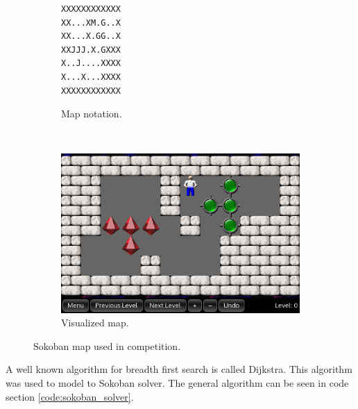 \begin{figure}[h]
 \centering
 \begin{subfigure}[b]{0.16\textwidth}
   \begin{minipage}{\linewidth}
\begin{verbatim}
XXXXXXXXXXXX
XX...XM.G..X
XX...X.GG..X
XXJJJ.X.GXXX
X..J....XXXX
X...X...XXXX
XXXXXXXXXXXX
\end{verbatim}
 \end{minipage}
 \caption{Map notation.}
 \label{fig:map_notation}
 \end{subfigure}~~~
 \begin{subfigure}[b]{0.3\textwidth}
  \includegraphics[width=\linewidth]{img/sokoban_2015}
 \caption{Visualized map.}
 \label{fig:sokoban_map_2015_img}
 \end{subfigure}
 \caption{Sokoban map used in competition.}
\end{figure}

A well known algorithm for breadth first search is called Dijkstra.
This algorithm was used to model to Sokoban solver.
The general algorithm can be seen in code section \ref{code:sokoban_solver}.

